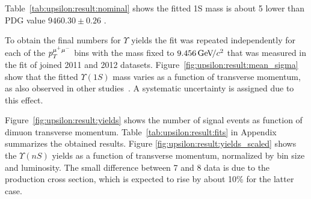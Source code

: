 




Table~\ref{tab:upsilon:result:nominal} shows the fitted \Y1S mass is about
5 \mevcc lower than PDG value $9460.30 \pm  0.26$ \mevcc.

% 


To obtain the final numbers for $\Upsilon$ yields the fit was repeated
independently for each of the $p_T^{\mu^+\mu^-}$ bins with the \OneS mass fixed to
$9.456 {\mathrm{\,Ge\kern -0.1em V\!/}c^2}$ that was measured in the fit of joined 2011 and 2012 datasets.
Figure~\ref{fig:upsilon:result:mean_sigma} show that the fitted $\Upsilon(1S)$
mass varies as a function of transverse momentum, as also observed in other
studies~\cite{Aaij:2013yaa}. A systematic uncertainty is assigned due to
this effect.

Figure~\ref{fig:upsilon:result:yields} shows the number of signal events as
function of dimuon transverse momentum. Table~\ref{tab:upsilon:result:fits} in
Appendix summarizes the obtained results. Figure
\ref{fig:upsilon:result:yields_scaled} shows the $\Upsilon(nS)$ yields as a
function of transverse momentum, normalized by bin size and luminosity. The
small difference between 7 and 8 \tev data is due to the production cross
section, which is expected to rise by about 10\% for the latter case.




